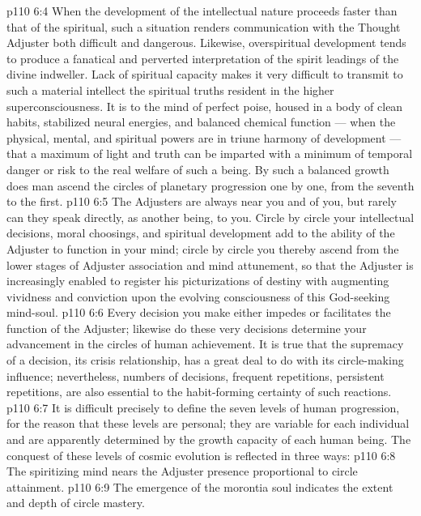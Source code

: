 \vs p110 6:4 When the development of the intellectual nature proceeds faster than that of the spiritual, such a situation renders communication with the Thought Adjuster both difficult and dangerous. Likewise, overspiritual development tends to produce a fanatical and perverted interpretation of the spirit leadings of the divine indweller. Lack of spiritual capacity makes it very difficult to transmit to such a material intellect the spiritual truths resident in the higher superconsciousness. It is to the mind of perfect poise, housed in a body of clean habits, stabilized neural energies, and balanced chemical function --- when the physical, mental, and spiritual powers are in triune harmony of development --- that a maximum of light and truth can be imparted with a minimum of temporal danger or risk to the real welfare of such a being. By such a balanced growth does man ascend the circles of planetary progression one by one, from the seventh to the first.
\vs p110 6:5 \pc The Adjusters are always near you and of you, but rarely can they speak directly, as another being, to you. Circle by circle your intellectual decisions, moral choosings, and spiritual development add to the ability of the Adjuster to function in your mind; circle by circle you thereby ascend from the lower stages of Adjuster association and mind attunement, so that the Adjuster is increasingly enabled to register his picturizations of destiny with augmenting vividness and conviction upon the evolving consciousness of this God\hyp{}seeking mind\hyp{}soul.
\vs p110 6:6 \pc Every decision you make either impedes or facilitates the function of the Adjuster; likewise do these very decisions determine your advancement in the circles of human achievement. It is true that the supremacy of a decision, its crisis relationship, has a great deal to do with its circle\hyp{}making influence; nevertheless, numbers of decisions, frequent repetitions, persistent repetitions, are also essential to the habit\hyp{}forming certainty of such reactions.
\vs p110 6:7 It is difficult precisely to define the seven levels of human progression, for the reason that these levels are personal; they are variable for each individual and are apparently determined by the growth capacity of each human being. The conquest of these levels of cosmic evolution is reflected in three ways:
\vs p110 6:8 \bibnobreakspace {} The spiritizing mind nears the Adjuster presence proportional to circle attainment.
\vs p110 6:9 \bibnobreakspace {} The emergence of the morontia soul indicates the extent and depth of circle mastery.
